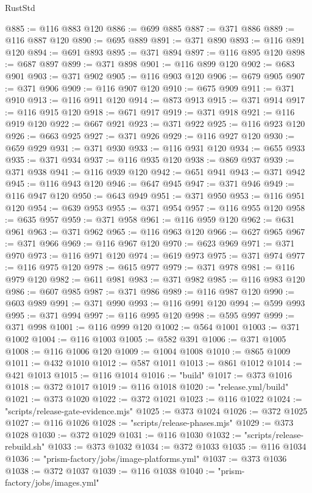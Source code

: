 \begin{lexlean}{RustStd}
\begin{coremodule}
@885 := @116 @883 @120
@886 := @699 @885
@887 := @371 @886
@889 := @116 @887 @120
@890 := @695 @889
@891 := @371 @890
@893 := @116 @891 @120
@894 := @691 @893
@895 := @371 @894
@897 := @116 @895 @120
@898 := @687 @897
@899 := @371 @898
@901 := @116 @899 @120
@902 := @683 @901
@903 := @371 @902
@905 := @116 @903 @120
@906 := @679 @905
@907 := @371 @906
@909 := @116 @907 @120
@910 := @675 @909
@911 := @371 @910
@913 := @116 @911 @120
@914 := @873 @913
@915 := @371 @914
@917 := @116 @915 @120
@918 := @671 @917
@919 := @371 @918
@921 := @116 @919 @120
@922 := @667 @921
@923 := @371 @922
@925 := @116 @923 @120
@926 := @663 @925
@927 := @371 @926
@929 := @116 @927 @120
@930 := @659 @929
@931 := @371 @930
@933 := @116 @931 @120
@934 := @655 @933
@935 := @371 @934
@937 := @116 @935 @120
@938 := @869 @937
@939 := @371 @938
@941 := @116 @939 @120
@942 := @651 @941
@943 := @371 @942
@945 := @116 @943 @120
@946 := @647 @945
@947 := @371 @946
@949 := @116 @947 @120
@950 := @643 @949
@951 := @371 @950
@953 := @116 @951 @120
@954 := @639 @953
@955 := @371 @954
@957 := @116 @955 @120
@958 := @635 @957
@959 := @371 @958
@961 := @116 @959 @120
@962 := @631 @961
@963 := @371 @962
@965 := @116 @963 @120
@966 := @627 @965
@967 := @371 @966
@969 := @116 @967 @120
@970 := @623 @969
@971 := @371 @970
@973 := @116 @971 @120
@974 := @619 @973
@975 := @371 @974
@977 := @116 @975 @120
@978 := @615 @977
@979 := @371 @978
@981 := @116 @979 @120
@982 := @611 @981
@983 := @371 @982
@985 := @116 @983 @120
@986 := @607 @985
@987 := @371 @986
@989 := @116 @987 @120
@990 := @603 @989
@991 := @371 @990
@993 := @116 @991 @120
@994 := @599 @993
@995 := @371 @994
@997 := @116 @995 @120
@998 := @595 @997
@999 := @371 @998
@1001 := @116 @999 @120
@1002 := @564 @1001
@1003 := @371 @1002
@1004 := @116 @1003
@1005 := @582 @391
@1006 := @371 @1005
@1008 := @116 @1006 @120
@1009 := @1004 @1008
@1010 := @865 @1009
@1011 := @432 @1010
@1012 := @587 @1011
@1013 := @861 @1012
@1014 := @421 @1013
@1015 := @116 @1014
@1016 := "build"
@1017 := @373 @1016
@1018 := @372 @1017
@1019 := @116 @1018
@1020 := "release.yml/build"
@1021 := @373 @1020
@1022 := @372 @1021
@1023 := @116 @1022
@1024 := "scripts/release-gate-evidence.mjs"
@1025 := @373 @1024
@1026 := @372 @1025
@1027 := @116 @1026
@1028 := "scripts/release-phases.mjs"
@1029 := @373 @1028
@1030 := @372 @1029
@1031 := @116 @1030
@1032 := "scripts/release-rebuild.sh"
@1033 := @373 @1032
@1034 := @372 @1033
@1035 := @116 @1034
@1036 := "prism-factory/jobs/image-platforms.yml"
@1037 := @373 @1036
@1038 := @372 @1037
@1039 := @116 @1038
@1040 := "prism-factory/jobs/images.yml"

\end{coremodule}
\end{lexlean}
